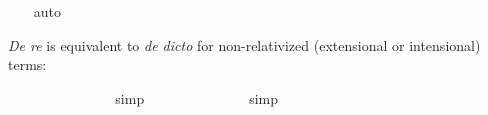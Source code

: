 \begin{isabellebody}
%
\isadelimproof
\ \ %
\endisadelimproof
%
\isatagproof
{}\isamarkupfalse%
\ auto%
\endisatagproof
{\isafoldproof}%
%
\isadelimproof
%
\endisadelimproof
%
\isamarkuptrue%
%
\begin{isamarkuptext}%
\emph{De re} is equivalent to \emph{de dicto} for non-relativized (extensional or intensional) terms:%
\end{isamarkuptext}\isamarkuptrue%
\isamarkupfalse%
\ {\isachardoublequoteopen}{\isasymlfloor}\isactrlbold {\isasymforall}{\isasymalpha}{\isachardot}\ {\isacharparenleft}{\isacharparenleft}{\isasymlambda}{\isasymbeta}{\isachardot}\ \isactrlbold {\isasymbox}{\isacharparenleft}{\isasymalpha}\ {\isasymbeta}{\isacharparenright}{\isacharparenright}\ {\isacharparenleft}{\isasymtau}{\isacharcolon}{\isacharcolon}{\isasymzero}{\isacharparenright}{\isacharparenright}\ \ \ \isactrlbold {\isasymleftrightarrow}\ \isactrlbold {\isasymbox}{\isacharparenleft}{\isacharparenleft}{\isasymlambda}{\isasymbeta}{\isachardot}\ {\isacharparenleft}{\isasymalpha}\ {\isasymbeta}{\isacharparenright}{\isacharparenright}\ {\isasymtau}{\isacharparenright}{\isasymrfloor}{\isachardoublequoteclose}%
\isadelimproof
\ %
\endisadelimproof
%
\isatagproof
{}\isamarkupfalse%
\ simp%
\endisatagproof
{\isafoldproof}%
%
\isadelimproof
%
\endisadelimproof
\isanewline
{}\isamarkupfalse%
\ {\isachardoublequoteopen}{\isasymlfloor}\isactrlbold {\isasymforall}{\isasymalpha}{\isachardot}\ {\isacharparenleft}{\isacharparenleft}{\isasymlambda}{\isasymbeta}{\isachardot}\ \isactrlbold {\isasymbox}{\isacharparenleft}{\isasymalpha}\ {\isasymbeta}{\isacharparenright}{\isacharparenright}\ {\isacharparenleft}{\isasymtau}{\isacharcolon}{\isacharcolon}{\isasymup}{\isasymzero}{\isacharparenright}{\isacharparenright}\ \ \isactrlbold {\isasymleftrightarrow}\ \isactrlbold {\isasymbox}{\isacharparenleft}{\isacharparenleft}{\isasymlambda}{\isasymbeta}{\isachardot}\ {\isacharparenleft}{\isasymalpha}\ {\isasymbeta}{\isacharparenright}{\isacharparenright}\ {\isasymtau}{\isacharparenright}{\isasymrfloor}{\isachardoublequoteclose}%
\isadelimproof
\ %
\endisadelimproof
%
\isatagproof
{}\isamarkupfalse%
\ simp%
\endisatagproof
{\isafoldproof}%
%
\isadelimproof
%
\endisadelimproof
\isanewline
{}\isamarkupfalse%
\ {\isachardoublequoteopen}{\isasymlfloor}\isactrlbold {\isasymforall}{\isasymalpha}{\isachardot}\ {\isacharparenleft}{\isacharparenleft}{\isasymlambda}{\isasymbeta}{\isachardot}\ \isactrlbold {\isasymbox}{\isacharparenleft}{\isasymalpha}\ {\isasymbeta}{\isacharparenright}{\isacharparenright}\ {\isacharparenleft}{\isasymtau}{\isacharcolon}{\isacharcolon}{\isasymlangle}{\isasymzero}{\isasymrangle}{\isacharparenright}{\isacharparenright}\ \ \isactrlbold {\isasymleftrightarrow}\ \isactrlbold {\isasymbox}{\isacharparenleft}{\isacharparenleft}{\isasymlambda}{\isasymbeta}{\isachardot}\ {\isacharparenleft}{\isasymalpha}\ {\isasymbeta}{\isacharparenright}{\isacharparenright}\ {\isasymtau}{\isacharparenright}{\isasymrfloor}{\isachardoublequoteclose}%

\end{isabellebody}
